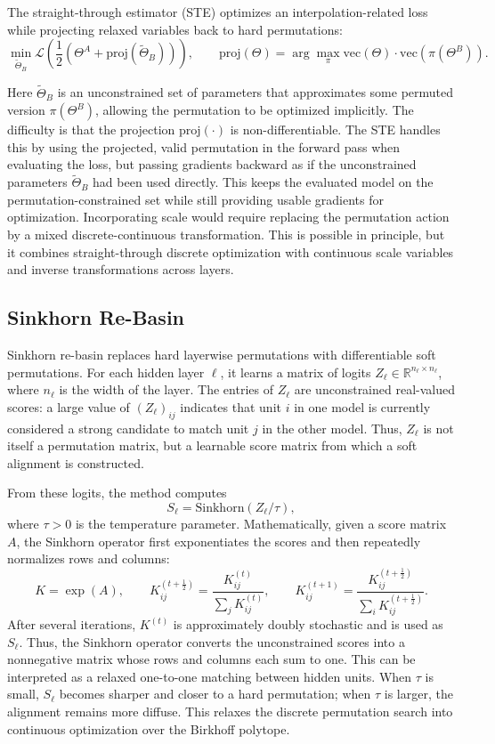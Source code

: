 \documentclass[11pt,a4paper]{report}
\begin{document}
The straight-through estimator (STE) \citep{ainsworth2023git} optimizes an interpolation-related loss while projecting relaxed variables back to hard permutations:
\[
\min_{\widetilde{\Theta}_B}
\mathcal{L}\!\left(\frac{1}{2}(\Theta^A+\mathrm{proj}(\widetilde{\Theta}_B))\right),
\qquad
\mathrm{proj}(\Theta)
=
\arg\max_{\pi}
\mathrm{vec}(\Theta)\cdot\mathrm{vec}(\pi(\Theta^B)).
\]

Here \(\widetilde{\Theta}_B\) is an unconstrained set of parameters that approximates some permuted version \(\pi(\Theta^B)\), allowing the permutation to be optimized implicitly. The difficulty is that the projection \(\mathrm{proj}(\cdot)\) is non-differentiable. The STE handles this by using the projected, valid permutation in the forward pass when evaluating the loss, but passing gradients backward as if the unconstrained parameters \(\widetilde{\Theta}_B\) had been used directly. This keeps the evaluated model on the permutation-constrained set while still providing usable gradients for optimization.
Incorporating scale would require replacing the permutation action by a mixed discrete-continuous transformation. This is possible in principle, but it combines straight-through discrete optimization with continuous scale variables and inverse transformations across layers.

\subsection{Sinkhorn Re-Basin}

Sinkhorn re-basin \citep{guerrero2023rebasin} replaces hard layerwise permutations with differentiable soft permutations. For each hidden layer \(\ell\), it learns a matrix of logits \(Z_\ell \in \mathbb{R}^{n_\ell \times n_\ell}\), where \(n_\ell\) is the width of the layer. The entries of \(Z_\ell\) are unconstrained real-valued scores: a large value of \((Z_\ell)_{ij}\) indicates that unit \(i\) in one model is currently considered a strong candidate to match unit \(j\) in the other model. Thus, \(Z_\ell\) is not itself a permutation matrix, but a learnable score matrix from which a soft alignment is constructed.

From these logits, the method computes
\[
S_\ell=\mathrm{Sinkhorn}(Z_\ell/\tau),
\]
where \(\tau>0\) is the temperature parameter. Mathematically, given a score matrix \(A\), the Sinkhorn operator first exponentiates the scores and then repeatedly normalizes rows and columns:
\[
K=\exp(A),\qquad
K^{(t+\frac{1}{2})}_{ij}
=
\frac{K^{(t)}_{ij}}{\sum_j K^{(t)}_{ij}},
\qquad
K^{(t+1)}_{ij}
=
\frac{K^{(t+\frac{1}{2})}_{ij}}{\sum_i K^{(t+\frac{1}{2})}_{ij}}.
\]
After several iterations, \(K^{(t)}\) is approximately doubly stochastic and is used as \(S_\ell\). Thus, the Sinkhorn operator converts the unconstrained scores into a nonnegative matrix whose rows and columns each sum to one. This can be interpreted as a relaxed one-to-one matching between hidden units. When \(\tau\) is small, \(S_\ell\) becomes sharper and closer to a hard permutation; when \(\tau\) is larger, the alignment remains more diffuse. This relaxes the discrete permutation search into continuous optimization over the Birkhoff polytope.
\end{document}
